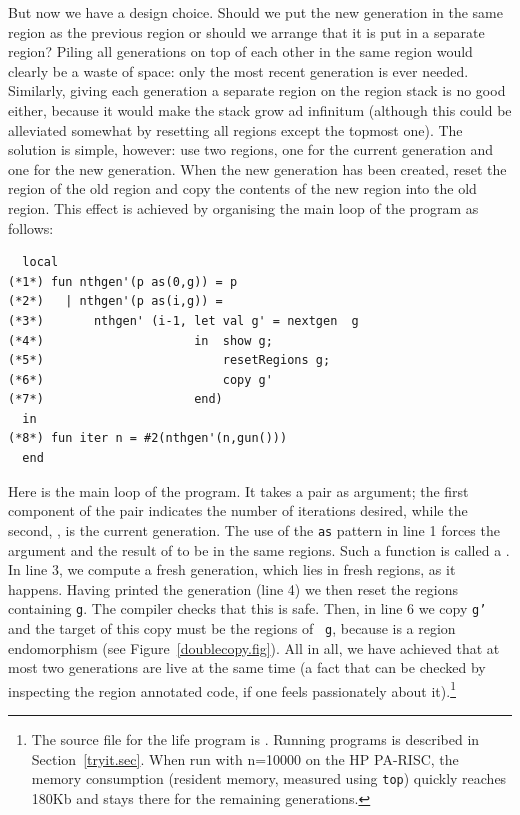 \documentclass[12pt]{book}
\begin{document}
But now we have a design choice. Should we put the new generation in
the same region as the previous region or should we arrange that it is
put in a separate region? Piling all generations on top of each
other in the same region
would clearly be a waste of space: only the most recent generation is
ever needed. Similarly, giving each generation a separate region on the
region stack is no good either, because it would make the stack grow
ad infinitum (although this could be alleviated somewhat by resetting
all regions except the topmost one). The solution is simple, however:
use two regions, one for the current generation and one for the new
generation. When the new generation has been created, reset the region
of the old region and copy the contents of 
the new region into the old region. This effect is
achieved by organising the main loop of the program as follows:
\begin{verbatim}
  local 
(*1*) fun nthgen'(p as(0,g)) = p 
(*2*)   | nthgen'(p as(i,g)) = 
(*3*)       nthgen' (i-1, let val g' = nextgen  g
(*4*)                     in  show g;
(*5*)                         resetRegions g;
(*6*)                         copy g'
(*7*)                     end)
  in 
(*8*) fun iter n = #2(nthgen'(n,gun()))
  end
\end{verbatim}
Here  is the main loop of
the program. It takes a pair as argument; the first component of the
pair indicates the number of iterations desired, while the second,
, is the current generation. The use of the {\tt as} pattern
in line 1 forces the argument and the result of  to be
in the same regions. Such a function is called a . In line 3, we compute a
fresh generation, which lies in fresh regions, as it happens. Having
printed the generation (line 4) we then reset the regions containing
{\tt g}. The compiler checks that this is safe. Then, in line 6 we
copy {\tt g'} and the target of this copy must be the regions of {\tt
  g}, because  is a region endomorphism (see
Figure~\ref{doublecopy.fig}).  All in all, we have achieved that at
most two generations are live at the same time (a fact that can be
checked by inspecting the region annotated code, if one feels
passionately about it).\footnote{The source file for the life program
  is . Running programs
  is described in Section~\ref{tryit.sec}. When run with n=10000 on
  the HP PA-RISC, the memory consumption (resident memory, measured
  using {\tt top}) quickly reaches 180Kb and
  stays there for the remaining generations.}
\end{document}
